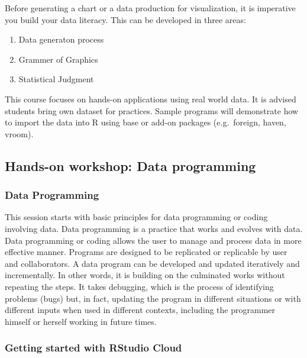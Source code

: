 \documentclass[
]{book}
\providecommand{\tightlist}{%
  \setlength{\itemsep}{0pt}\setlength{\parskip}{0pt}}
\begin{document}
Before generating a chart or a data production for visualization, it is imperative you build your data literacy. This can be developed in three areas:

\begin{enumerate}
\def\labelenumi{\arabic{enumi}.}
\tightlist
\item
  Data generaton process
\item
  Grammer of Graphics
\item
  Statistical Judgment
\end{enumerate}

This course focuses on hands-on applications using real world data. It is advised students bring own dataset for practices. Sample programs will demonstrate how to import the data into R using base or add-on packages (e.g.~foreign, haven, vroom).

\hypertarget{hands-on-workshop-data-programming}{%
\subsection{Hands-on workshop: Data programming}\label{hands-on-workshop-data-programming}}

\hypertarget{data-programming}{%
\subsubsection{Data Programming}\label{data-programming}}

This session starts with basic principles for data programming or coding involving data. Data programming is a practice that works and evolves with data. Data programming or coding allows the user to manage and process data in more effective manner. Programs are designed to be replicated or replicable by user and collaborators. A data program can be developed and updated iteratively and incrementally. In other words, it is building on the culminated works without repeating the steps. It takes debugging, which is the process of identifying problems (bugs) but, in fact, updating the program in different situations or with different inputs when used in different contexts, including the programmer himself or herself working in future times.

\hypertarget{getting-started-with-rstudio-cloud}{%
\subsubsection{Getting started with RStudio Cloud}\label{getting-started-with-rstudio-cloud}}
\end{document}
